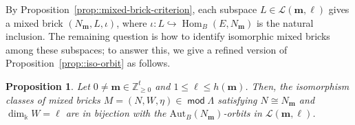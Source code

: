\documentclass[a4,12pt]{amsart}
\numberwithin{equation}{section} %
\def\Hom{\operatorname{Hom}} %
\def\mod{\operatorname{\mathsf{mod}}}
\def\Aut{\mathrm{Aut}} %
\newtheorem{proposition}[theorem]{Proposition} %
\theoremstyle{definition} %
\begin{document}
By Proposition~\ref{prop::mixed-brick-criterion}, each subspace $L\in\mathcal{L}(\mathbf{m},\ell)$ gives a mixed brick $(N_{\mathbf{m}},L,\iota)$, where $\iota\colon L\hookrightarrow\Hom_B(E,N_{\mathbf{m}})$ is the natural inclusion. The remaining question is how to identify isomorphic mixed bricks among these subspaces; to answer this, we give a refined version of Proposition~\ref{prop::iso-orbit} as follows.

\begin{proposition}\label{prop::mixed-bricks-orbits} 
Let $0\neq \mathbf{m}\in\mathbb{Z}_{\geq 0}^t$ and $1\leq\ell\leq h(\mathbf{m})$. Then, the isomorphism classes of mixed bricks $M=(N,W,\eta)\in \mod \Lambda$ satisfying $N\cong N_{\mathbf{m}}$ and $\dim_{\Bbbk} W=\ell$ are in bijection with the $\Aut_B(N_{\mathbf{m}})$-orbits in $\mathcal{L}(\mathbf{m},\ell)$.
\end{proposition} 
\end{document}
